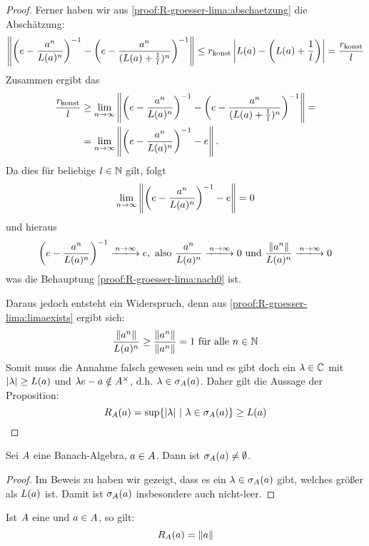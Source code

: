 \begin{proof}
Ferner haben wir aus \ref{proof:R-groesser-lima:abschaetzung} die Abschätzung:
	\[\left\lVert\left(e - \frac{a^n}{L(a)^n}\right)^{-1} - \left(e - \frac{a^n}{(L(a) + \frac{1}{l})^n}\right)^{-1}\right\rVert \leq r_\textup{konst}\left|L(a)-\left(L(a)+\frac{1}{l}\right)\right| = \frac{r_\textup{konst}}{l}\]
Zusammen ergibt das
	\begin{align*}\frac{r_\textup{konst}}{l} &\geq \underset{n\to\infty}{\lim} \left\lVert\left(e - \frac{a^n}{L(a)^n}\right)^{-1} - \left(e - \frac{a^n}{(L(a) + \frac{1}{l})^n}\right)^{-1}\right\rVert = \\
	&= \underset{n\to\infty}{\lim} \left\lVert\left(e - \frac{a^n}{L(a)^n}\right)^{-1} - e\right\rVert.
	\end{align*}
Da dies für beliebige $l \in \mathbb{N}$ gilt, folgt
	\[\underset{n\to\infty}{\lim} \left\lVert\left(e - \frac{a^n}{L(a)^n}\right)^{-1} - e\right\rVert = 0\]
und hieraus
	\[\left(e - \frac{a^n}{\lima^n}\right)^{-1} \xlongrightarrow{n\to\infty} e, \text{ also } \frac{a^n}{\lima^n} \xlongrightarrow{n\to\infty} 0 \text{ und } \frac{\norm{a^n}}{\lima^n} \xlongrightarrow{n\to\infty} 0\]
was die Behauptung \ref{proof:R-groesser-lima:nach0} ist.	

Daraus jedoch entsteht ein Widerspruch, denn aus \ref{proof:R-groesser-lima:limaexists} ergibt sich: 
	\[\frac{\left\lVert a^n\right\rVert}{L(a)^n} \geq \frac{\left\lVert a^n\right\rVert}{\left\lVert a^n\right\rVert} = 1 \text{ für alle } n\in \mathbb{N}\]
Somit muss die Annahme falsch gewesen sein und es gibt doch ein $\lambda \in \mathbb{C}$ mit $|\lambda| \geq L(a)$ und $\lambda e - a \notin A^\times$, d.h. $\lambda \in \sigma_A(a)$. Daher gilt die Aussage der Proposition:
	\[R_A(a) = \sup\{|\lambda| ~|~ \lambda \in \sigma_A(a)\} \geq L(a)\]
\end{proof}


\begin{kor}\label{kor:spektrum-nicht-leer}
Sei $A$ eine Banach-Algebra, $a \in A$. Dann ist $\sigma_A(a) \neq \emptyset$.
\end{kor}

\begin{proof}
Im Beweis zu  haben wir gezeigt, dass es ein $\lambda \in \sigma_A(a)$ gibt, welches größer als $L(a)$ ist. Damit ist $\sigma_A(a)$ insbesondere auch nicht-leer.
\end{proof}

\begin{prop}\label{prop:R-gleich-Norm}
Ist $A$ eine \CAlg{} und $a \in A$, so gilt: 
	\[R_A(a) = \left\lVert a\right\rVert\]
\end{prop}

